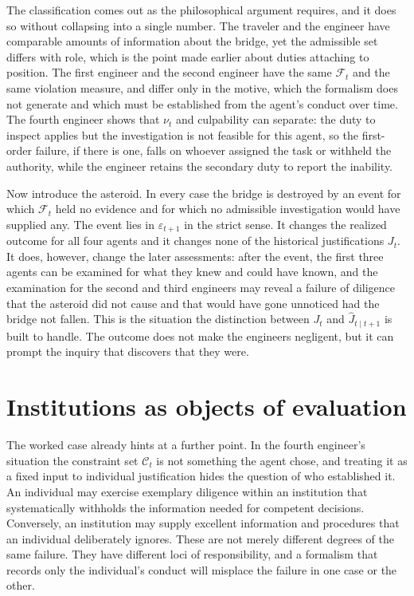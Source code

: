 \documentclass[11pt]{article}
\newcommand{\F}{\mathcal F}
\newcommand{\C}{\mathcal C}
\theoremstyle{definition}
\begin{document}
The classification comes out as the philosophical argument requires, and it does so without collapsing into a single number. The traveler and the engineer have comparable amounts of information about the bridge, yet the admissible set differs with role, which is the point made earlier about duties attaching to position. The first engineer and the second engineer have the same $\F_t$ and the same violation measure, and differ only in the motive, which the formalism does not generate and which must be established from the agent's conduct over time. The fourth engineer shows that $\nu_t$ and culpability can separate: the duty to inspect applies but the investigation is not feasible for this agent, so the first-order failure, if there is one, falls on whoever assigned the task or withheld the authority, while the engineer retains the secondary duty to report the inability.

Now introduce the asteroid. In every case the bridge is destroyed by an event for which $\F_t$ held no evidence and for which no admissible investigation would have supplied any. The event lies in $\varepsilon_{t+1}$ in the strict sense. It changes the realized outcome for all four agents and it changes none of the historical justifications $J_t$. It does, however, change the later assessments: after the event, the first three agents can be examined for what they knew and could have known, and the examination for the second and third engineers may reveal a failure of diligence that the asteroid did not cause and that would have gone unnoticed had the bridge not fallen. This is the situation the distinction between $J_t$ and $\widehat J_{t\mid t+1}$ is built to handle. The outcome does not make the engineers negligent, but it can prompt the inquiry that discovers that they were.

\section{Institutions as objects of evaluation}

The worked case already hints at a further point. In the fourth engineer's situation the constraint set $\C_t$ is not something the agent chose, and treating it as a fixed input to individual justification hides the question of who established it. An individual may exercise exemplary diligence within an institution that systematically withholds the information needed for competent decisions. Conversely, an institution may supply excellent information and procedures that an individual deliberately ignores. These are not merely different degrees of the same failure. They have different loci of responsibility, and a formalism that records only the individual's conduct will misplace the failure in one case or the other.
\end{document}
